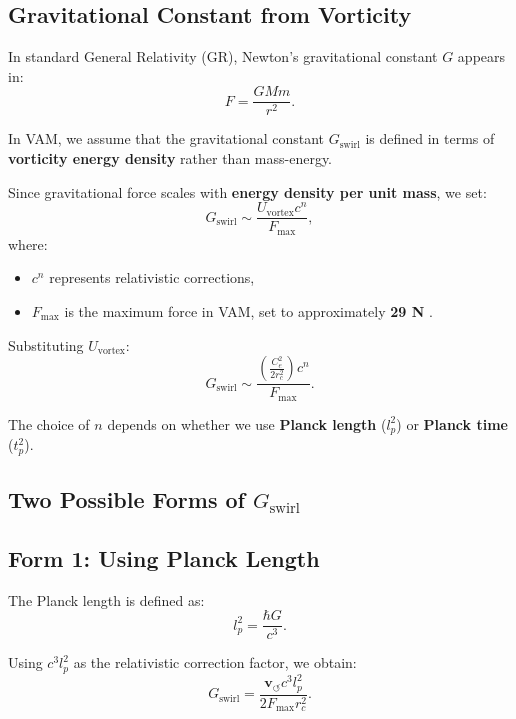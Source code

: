 \documentclass[preprint]{revtex4-2}
\begin{document}
    \subsection*{Gravitational Constant from Vorticity}
    In standard General Relativity (GR), Newton's gravitational constant \( G \) appears in:
    \begin{equation*}
        F = \frac{GMm}{r^2}.
    \end{equation*}

    In VAM, we assume that the gravitational constant \(  G_\text{swirl} \) is defined in terms of \textbf{vorticity energy density} rather than mass-energy.

    Since gravitational force scales with \textbf{energy density per unit mass}, we set:
    \begin{equation*}
        G_\text{swirl} \sim \frac{U_\text{vortex} c^n}{F_{\max}},
    \end{equation*}
    where:
    \begin{itemize}
        \item \( c^n \) represents relativistic corrections,
        \item \( F_{\max} \) is the maximum force in VAM, set to approximately \textbf{29 N} \cite{schiller_max_force}.
    \end{itemize}

    Substituting \( U_\text{vortex} \):
    \begin{equation*}
        G_\text{swirl} \sim \frac{\left( \frac{C_e^2}{2 r_c^2} \right) c^n}{F_{\max}}.
    \end{equation*}

    The choice of \( n \) depends on whether we use \textbf{Planck length} (\( l_p^2 \)) or \textbf{Planck time} (\( t_p^2 \)).

    \subsection*{Two Possible Forms of \(  G_\text{swirl} \)}
    \subsection*{Form 1: Using Planck Length}
    The Planck length is defined as:
    \begin{equation*}
        l_p^2 = \frac{\hbar G}{c^3}.
    \end{equation*}

    Using \( c^3 l_p^2 \) as the relativistic correction factor, we obtain:
    \begin{equation*}
        G_\text{swirl} = \frac{\mathbf{v}_{\scriptscriptstyle\boldsymbol{\circlearrowleft}} c^3 l_p^2}{2 F_{\max} r_c^2}.
    \end{equation*}
\end{document}
